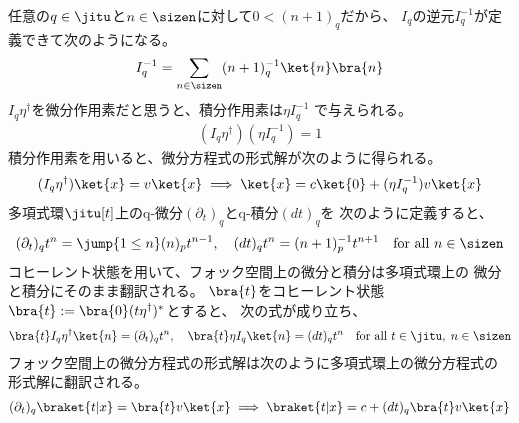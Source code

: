 {	\begin{note}[微分方程式]\label{note:微分方程式} %
		任意の$q\in\jitu$と$n\in\sizen$に対して$0<(n + 1)_q$だから、
		$I_q$の逆元$I_q^{-1}$が定義できて次のようになる。
		\begin{equation*}\begin{split}
			I_q^{-1} = \sum_{n\in\sizen} (n + 1)_q^{-1}\ket{n}\bra{n}
		\end{split}\end{equation*}
		$I_q\eta^\dag$を微分作用素だと思うと、積分作用素は$\eta I_q^{-1}$
		で与えられる。
		\begin{equation*}\begin{split}
			(I_q\eta^\dag)(\eta I_q^{-1}) = 1
		\end{split}\end{equation*}
		積分作用素を用いると、微分方程式の形式解が次のように得られる。
		\begin{equation*}\begin{split}
			(I_q\eta^\dag)\ket{x} = v\ket{x}
			\implies \ket{x} = c\ket{0} + (\eta I_q^{-1})v\ket{x}
		\end{split}\end{equation*}
		多項式環$\jitu[t]$上のq-微分$(\partial_t)_q$とq-積分$(dt)_q$を
		次のように定義すると、
		\begin{equation*}\begin{split}
			(\partial_t)_qt^n = \jump{1\le n}(n)_pt^{n-1},\quad
			(dt)_qt^n = (n+1)_p^{-1}t^{n+1} \quad\text{for all } n\in\sizen
		\end{split}\end{equation*}
		コヒーレント状態を用いて、フォック空間上の微分と積分は多項式環上の
		微分と積分にそのまま翻訳される。
		$\bra{t}$をコヒーレント状態$\bra{t}:=\bra{0}(t\eta^\dag)^*$とすると、
		次の式が成り立ち、
		\begin{equation*}\begin{split}
			\bra{t}I_q\eta^\dag\ket{n} = (\partial_t)_q t^n,\quad
			\bra{t}\eta I_q\ket{n} = (dt)_q t^n
			\quad\text{for all } t\in\jitu,\; n\in\sizen
		\end{split}\end{equation*}
		フォック空間上の微分方程式の形式解は次のように多項式環上の微分方程式の
		形式解に翻訳される。
		\begin{equation*}\begin{split}
			(\partial_t)_q\braket{t|x} = \bra{t}v\ket{x}
			\implies \braket{t|x} = c + (dt)_q\bra{t}v\ket{x}
		\end{split}\end{equation*}

\end{note}}
